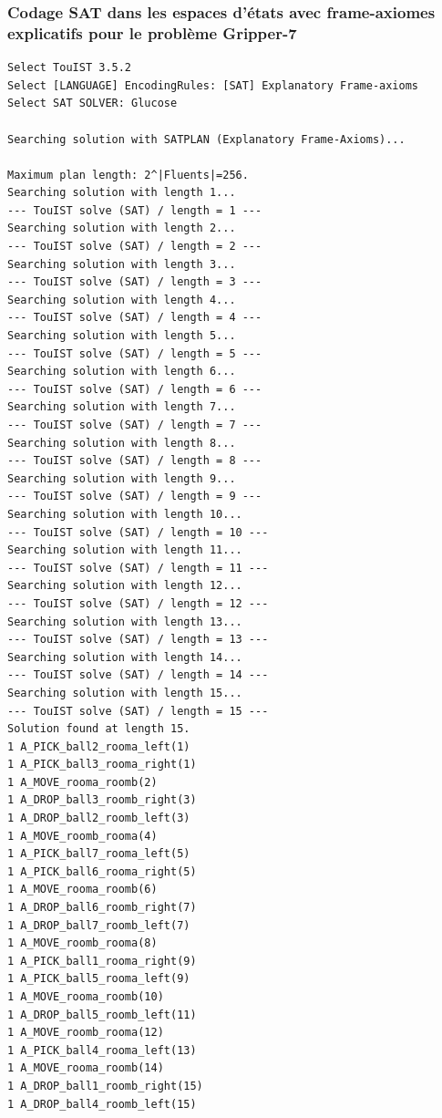 \subsubsection{Codage SAT dans les espaces d'états avec frame-axiomes explicatifs pour le problème Gripper-7}

\begin{scriptsize}
\begin{verbatim}
Select TouIST 3.5.2
Select [LANGUAGE] EncodingRules: [SAT] Explanatory Frame-axioms
Select SAT SOLVER: Glucose

Searching solution with SATPLAN (Explanatory Frame-Axioms)...

Maximum plan length: 2^|Fluents|=256.
Searching solution with length 1...
--- TouIST solve (SAT) / length = 1 ---
Searching solution with length 2...
--- TouIST solve (SAT) / length = 2 ---
Searching solution with length 3...
--- TouIST solve (SAT) / length = 3 ---
Searching solution with length 4...
--- TouIST solve (SAT) / length = 4 ---
Searching solution with length 5...
--- TouIST solve (SAT) / length = 5 ---
Searching solution with length 6...
--- TouIST solve (SAT) / length = 6 ---
Searching solution with length 7...
--- TouIST solve (SAT) / length = 7 ---
Searching solution with length 8...
--- TouIST solve (SAT) / length = 8 ---
Searching solution with length 9...
--- TouIST solve (SAT) / length = 9 ---
Searching solution with length 10...
--- TouIST solve (SAT) / length = 10 ---
Searching solution with length 11...
--- TouIST solve (SAT) / length = 11 ---
Searching solution with length 12...
--- TouIST solve (SAT) / length = 12 ---
Searching solution with length 13...
--- TouIST solve (SAT) / length = 13 ---
Searching solution with length 14...
--- TouIST solve (SAT) / length = 14 ---
Searching solution with length 15...
--- TouIST solve (SAT) / length = 15 ---
Solution found at length 15.
1 A_PICK_ball2_rooma_left(1)
1 A_PICK_ball3_rooma_right(1)
1 A_MOVE_rooma_roomb(2)
1 A_DROP_ball3_roomb_right(3)
1 A_DROP_ball2_roomb_left(3)
1 A_MOVE_roomb_rooma(4)
1 A_PICK_ball7_rooma_left(5)
1 A_PICK_ball6_rooma_right(5)
1 A_MOVE_rooma_roomb(6)
1 A_DROP_ball6_roomb_right(7)
1 A_DROP_ball7_roomb_left(7)
1 A_MOVE_roomb_rooma(8)
1 A_PICK_ball1_rooma_right(9)
1 A_PICK_ball5_rooma_left(9)
1 A_MOVE_rooma_roomb(10)
1 A_DROP_ball5_roomb_left(11)
1 A_MOVE_roomb_rooma(12)
1 A_PICK_ball4_rooma_left(13)
1 A_MOVE_rooma_roomb(14)
1 A_DROP_ball1_roomb_right(15)
1 A_DROP_ball4_roomb_left(15)
\end{verbatim}
\end{scriptsize}

